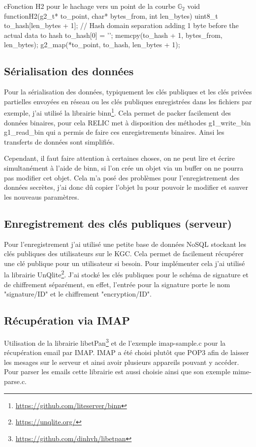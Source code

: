 \begin{sourcebox}{c}{Fonction H2 pour le hachage vers un point de la courbe $\mathbb{G}_2$}
	void functionH2(g2_t* to_point, char* bytes_from, int len_bytes){
		uint8_t to_hash[len_bytes + 1];
		// Hash domain separation adding 1 byte  before the actual data to hash
		to_hash[0] = '';
		memcpy(to_hash + 1, bytes_from, len_bytes);
		g2_map(*to_point, to_hash, len_bytes + 1);
	}
\end{sourcebox}

\subsection{Sérialisation des données}
Pour la sérialisation des données, typiquement les clés publiques et les clés privées partielles envoyées en réseau ou les clés publiques enregistrées dans les fichiers par exemple, j'ai utilisé la librairie binn\footnote{\url{https://github.com/liteserver/binn}}. Cela permet de packer facilement des données binaires, pour cela RELIC met à disposition des méthodes g1\_write\_bin g1\_read\_bin qui a permis de faire ces enregistrements binaires. Ainsi les transferts de données sont simplifiés.

Cependant, il faut faire attention à certaines choses, on ne peut lire et écrire simultanément à l'aide de binn, si l'on crée un objet via un buffer on ne pourra pas modifier cet objet. Cela m'a posé des problèmes pour l'enregistrement des données secrètes, j'ai donc dû copier l'objet lu pour pouvoir le modifier et sauver les nouveaus paramètres.

\subsection{Enregistrement des clés publiques (serveur)}
Pour l'enregistrement j'ai utilisé une petite base de données NoSQL stockant les clés publiques des utilisateurs sur le KGC. Cela permet de facilement récupérer une clé publique pour un utilisateur si besoin. Pour implémenter cela j'ai utilisé la librairie UnQlite\footnote{\url{https://unqlite.org/}}. J'ai stocké les clés publiques pour le schéma de signature et de chiffrement séparément, en effet, l'entrée pour la signature porte le nom "signature/ID" et le chiffrement "encryption/ID".

\subsection{Récupération via IMAP}
Utilisation de la librairie libetPan\footnote{\url{https://github.com/dinhvh/libetpan}} et de l'exemple imap-sample.c pour la récupération email par IMAP. IMAP a été choisi plutôt que POP3 afin de laisser les mesages sur le serveur et ainsi avoir plusieurs appareils pouvant y accéder. Pour parser les emails cette librairie est aussi choisie ainsi que son exemple mime-parse.c.

